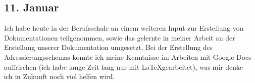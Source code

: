 \subsection{11. Januar}
Ich habe heute in der Berufsschule an einem weiteren Input zur Erstellung von Dokumentationen teilgenommen, sowie das gelernte in meiner Arbeit an der Erstellung unserer Dokumentation umgesetzt. Bei der Erstellung des Adressierungsschemas konnte ich meine Kenntnisse im Arbeiten mit Google Docs auffrischen (ich habe lange Zeit lang nur mit \LaTeX  gearbeitet), was mir denke ich in Zukunft noch viel helfen wird.